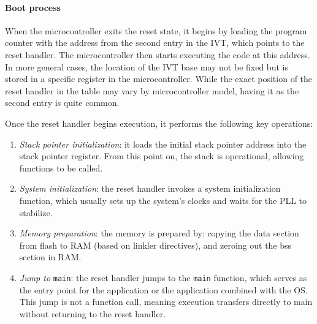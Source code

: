 \paragraph*{Boot process}
When the microcontroller exits the reset state, it begins by loading the program counter with the address from the second entry in the IVT, which points to the reset handler. 
The microcontroller then starts executing the code at this address.
In more general cases, the location of the IVT base may not be fixed but is stored in a specific register in the microcontroller.
While the exact position of the reset handler in the table may vary by microcontroller model, having it as the second entry is quite common.

Once the reset handler begins execution, it performs the following key operations:
\begin{enumerate}
    \item \textit{Stack pointer initialization}: it loads the initial stack pointer address into the stack pointer register.
        From this point on, the stack is operational, allowing functions to be called.
    \item \textit{System initialization}: the reset handler invokes a system initialization function, which usually sets up the system's clocks and waits for the PLL to stabilize.
    \item \textit{Memory preparation}: the memory is prepared by: copying the data section from flash to RAM (based on linkler directives), and zeroing out the bss section in RAM.
    \item \textit{Jump to} \texttt{main}: the reset handler jumps to the \texttt{main} function, which serves as the entry point for the application or the application combined with the OS. 
        This jump is not a function call, meaning execution transfers directly to main without returning to the reset handler.
\end{enumerate}

